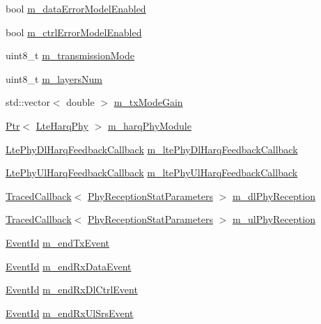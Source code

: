 \begin{DoxyCompactItemize}
bool \hyperlink{classns3_1_1LteSpectrumPhy_a0e5c57eaf647ff5723780ac9a4a2da18}{m\+\_\+data\+Error\+Model\+Enabled}
\item 
bool \hyperlink{classns3_1_1LteSpectrumPhy_ae3d443a6bcc0f458869155412b9a862f}{m\+\_\+ctrl\+Error\+Model\+Enabled}
\item 
uint8\+\_\+t \hyperlink{classns3_1_1LteSpectrumPhy_a186ddcdf95b723c9f60a3a026c0df288}{m\+\_\+transmission\+Mode}
\item 
uint8\+\_\+t \hyperlink{classns3_1_1LteSpectrumPhy_ab1d0926cae5c6dd4a2c80653cef439bc}{m\+\_\+layers\+Num}
\item 
std\+::vector$<$ double $>$ \hyperlink{classns3_1_1LteSpectrumPhy_a6578c9cd0b4944bbb56be27443c3519f}{m\+\_\+tx\+Mode\+Gain}
\item 
\hyperlink{classns3_1_1Ptr}{Ptr}$<$ \hyperlink{classns3_1_1LteHarqPhy}{Lte\+Harq\+Phy} $>$ \hyperlink{classns3_1_1LteSpectrumPhy_a6febfefe8b9da4a5559c5bb08bf77f26}{m\+\_\+harq\+Phy\+Module}
\item 
\hyperlink{namespacens3_af03b82938a46f6bddebfb63ec3b0f93c}{Lte\+Phy\+Dl\+Harq\+Feedback\+Callback} \hyperlink{classns3_1_1LteSpectrumPhy_acbb9b3ab972caa0ec5c50393b71b4f72}{m\+\_\+lte\+Phy\+Dl\+Harq\+Feedback\+Callback}
\item 
\hyperlink{namespacens3_acc408d565410d696cf016f2d4ead8d2a}{Lte\+Phy\+Ul\+Harq\+Feedback\+Callback} \hyperlink{classns3_1_1LteSpectrumPhy_a24f82f31791f4e60d1e6d9927b35380d}{m\+\_\+lte\+Phy\+Ul\+Harq\+Feedback\+Callback}
\item 
\hyperlink{classns3_1_1TracedCallback}{Traced\+Callback}$<$ \hyperlink{structns3_1_1PhyReceptionStatParameters}{Phy\+Reception\+Stat\+Parameters} $>$ \hyperlink{classns3_1_1LteSpectrumPhy_a49baf6d8358ac852b51545f752f82d67}{m\+\_\+dl\+Phy\+Reception}
\item 
\hyperlink{classns3_1_1TracedCallback}{Traced\+Callback}$<$ \hyperlink{structns3_1_1PhyReceptionStatParameters}{Phy\+Reception\+Stat\+Parameters} $>$ \hyperlink{classns3_1_1LteSpectrumPhy_ac86744120540d5bd999d11f3ac452de4}{m\+\_\+ul\+Phy\+Reception}
\item 
\hyperlink{classns3_1_1EventId}{Event\+Id} \hyperlink{classns3_1_1LteSpectrumPhy_a95011c60fa2c99a9295f7ab4420014c0}{m\+\_\+end\+Tx\+Event}
\item 
\hyperlink{classns3_1_1EventId}{Event\+Id} \hyperlink{classns3_1_1LteSpectrumPhy_a3e159bb935b2e02763559a8c0632ae00}{m\+\_\+end\+Rx\+Data\+Event}
\item 
\hyperlink{classns3_1_1EventId}{Event\+Id} \hyperlink{classns3_1_1LteSpectrumPhy_a18bd7b8d75f490ed803c75ace45ee346}{m\+\_\+end\+Rx\+Dl\+Ctrl\+Event}
\item 
\hyperlink{classns3_1_1EventId}{Event\+Id} \hyperlink{classns3_1_1LteSpectrumPhy_afa9f10d56316613e42a208f38b2d29bf}{m\+\_\+end\+Rx\+Ul\+Srs\+Event}
\end{DoxyCompactItemize}
